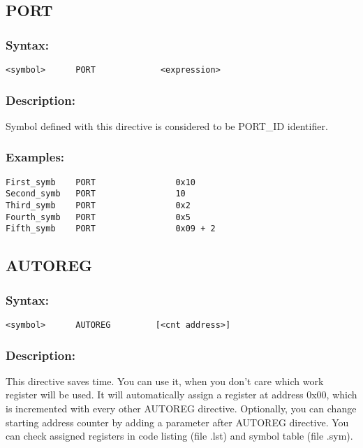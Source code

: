     \subsection{PORT}
        \subsubsection{Syntax:}
            {
                \usecodefont
                \verb'<symbol>      PORT             <expression>'
            }

        \subsubsection{Description:}
            Symbol defined with this directive is considered to be PORT\_ID identifier.

        \subsubsection{Examples:}
            {
                \usecodefont
                \verb'First_symb    PORT                0x10    '\\
                \verb'Second_symb   PORT                10      '\\
                \verb'Third_symb    PORT                0x2     '\\
                \verb'Fourth_symb   PORT                0x5     '\\
                \verb'Fifth_symb    PORT                0x09 + 2'\\
            }

    \subsection{AUTOREG}
        \subsubsection{Syntax:}
            {
                \usecodefont
                \verb'<symbol>      AUTOREG         [<cnt address>]'
            }

        \subsubsection{Description:}
            This directive saves time. You can use it, when you don't care which work register will be used. It will automatically assign a register at address 0x00, which is incremented with every other AUTOREG directive. Optionally, you can change starting address counter by adding a parameter after AUTOREG directive. You can check assigned registers in code listing (file .lst) and symbol table (file .sym).

